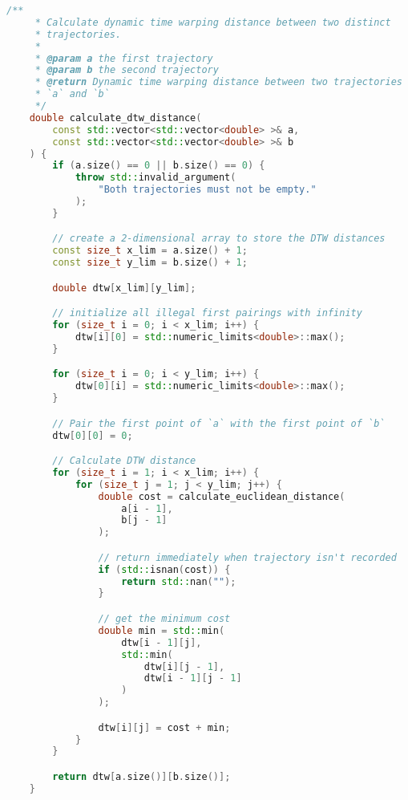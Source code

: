 \begin{lstlisting}[language=C++, caption=Implementasi fungsi \texttt{calculate\_dtw\_distance}, label={bab5:dtw}]
    /**
     * Calculate dynamic time warping distance between two distinct
     * trajectories.
     * 
     * @param a the first trajectory
     * @param b the second trajectory
     * @return Dynamic time warping distance between two trajectories
     * `a` and `b`
     */
    double calculate_dtw_distance(
        const std::vector<std::vector<double> >& a,
        const std::vector<std::vector<double> >& b
    ) {
        if (a.size() == 0 || b.size() == 0) {
            throw std::invalid_argument(
                "Both trajectories must not be empty."
            );
        }

        // create a 2-dimensional array to store the DTW distances
        const size_t x_lim = a.size() + 1;
        const size_t y_lim = b.size() + 1;

        double dtw[x_lim][y_lim];

        // initialize all illegal first pairings with infinity
        for (size_t i = 0; i < x_lim; i++) {
            dtw[i][0] = std::numeric_limits<double>::max();        
        }

        for (size_t i = 0; i < y_lim; i++) {
            dtw[0][i] = std::numeric_limits<double>::max();
        }

        // Pair the first point of `a` with the first point of `b`
        dtw[0][0] = 0;

        // Calculate DTW distance
        for (size_t i = 1; i < x_lim; i++) {
            for (size_t j = 1; j < y_lim; j++) {
                double cost = calculate_euclidean_distance(
                    a[i - 1],
                    b[j - 1]
                );

                // return immediately when trajectory isn't recorded
                if (std::isnan(cost)) {
                    return std::nan("");
                }

                // get the minimum cost
                double min = std::min(
                    dtw[i - 1][j],
                    std::min(
                        dtw[i][j - 1],
                        dtw[i - 1][j - 1]
                    )
                );

                dtw[i][j] = cost + min;
            }
        }

        return dtw[a.size()][b.size()];
    }
\end{lstlisting}

